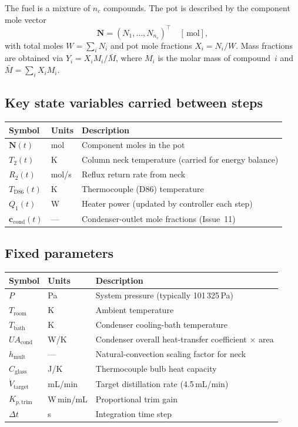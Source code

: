 \documentclass[11pt,letterpaper]{article}
\newcommand{\dt}{\Delta t}
\newcommand{\mol}{\,\text{mol}}
\begin{document}
The fuel is a mixture of $n_c$ compounds.  The pot is described by the component
mole vector
\begin{equation}
  \mathbf{N} = (N_1, \ldots, N_{n_c})^\top \quad [\mol],
\end{equation}
with total moles $W = \sum_i N_i$ and pot mole fractions $X_i = N_i / W$.
Mass fractions are obtained via $Y_i = X_i M_i / \bar{M}$, where $M_i$
is the molar mass of compound~$i$ and $\bar{M} = \sum_i X_i M_i$.

\subsection{Key state variables carried between steps}

\begin{center}
\begin{tabular}{lll}
\toprule
Symbol & Units & Description \\
\midrule
$\mathbf{N}(t)$ & mol & Component moles in the pot \\
$T_2(t)$ & K & Column neck temperature (carried for energy balance) \\
$R_2(t)$ & mol/s & Reflux return rate from neck \\
$T_{\mathrm{D86}}(t)$ & K & Thermocouple (D86) temperature \\
$Q_1(t)$ & W & Heater power (updated by controller each step) \\
$\mathbf{c}_{\mathrm{cond}}(t)$ & --- & Condenser-outlet mole fractions (Issue~11) \\
\bottomrule
\end{tabular}
\end{center}

\subsection{Fixed parameters}

\begin{center}
\begin{tabular}{lll}
\toprule
Symbol & Units & Description \\
\midrule
$P$ & Pa & System pressure (typically 101\,325\,Pa) \\
$T_{\mathrm{room}}$ & K & Ambient temperature \\
$T_{\mathrm{bath}}$ & K & Condenser cooling-bath temperature \\
$UA_{\mathrm{cond}}$ & W/K & Condenser overall heat-transfer coefficient $\times$ area \\
$h_{\mathrm{mult}}$ & --- & Natural-convection scaling factor for neck \\
$C_{\mathrm{glass}}$ & J/K & Thermocouple bulb heat capacity \\
$\dot{V}_{\mathrm{target}}$ & mL/min & Target distillation rate (4.5\,mL/min) \\
$K_{p,\mathrm{trim}}$ & W\,min/mL & Proportional trim gain \\
$\dt$ & s & Integration time step \\
\bottomrule
\end{tabular}
\end{center}
\end{document}
